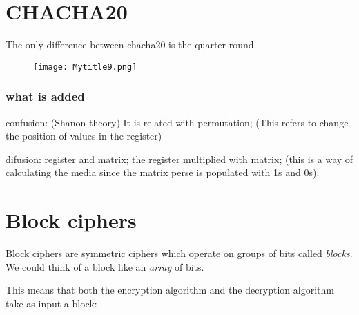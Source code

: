 \documentclass{article}
\begin{document}


\section{CHACHA20}

The only difference between chacha20 is the quarter-round.

\begin{figure} [H]
    \centering
    \texttt{[image: Mytitle9.png]}
\end{figure}
\subsubsection{what is added}

confusion: (Shanon theory) It is related with permutation; (This refers to change the position of values in the register)

difusion: register and matrix; the register multiplied with matrix; (this is a way of calculating the media since the matrix perse is populated with 1s and 0s).
  \section{Block ciphers}

  Block ciphers are symmetric ciphers which operate on groups of bits
  called \emph{blocks}.
  We could think of a block like an \emph{array} of bits.
  
  This means that both the encryption algorithm and the decryption
  algorithm take as input a block:

  \begin{center}
  \end{center}

  \begin{center}
  \end{center}
\end{document}
